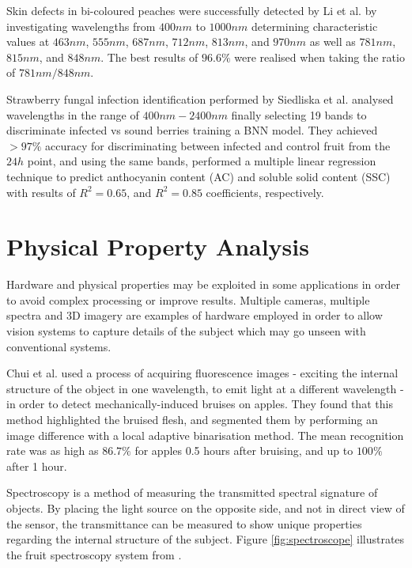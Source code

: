 \documentclass[fleqn,twoside,12pt]{report}
\begin{document}
Skin defects in bi-coloured peaches were successfully detected by Li et al.\cite{li2} by investigating wavelengths from $400nm$ to $1000nm$ determining characteristic values at $463nm$, $555nm$, $687nm$, $712nm$, $813nm$, and $970nm$ as well as $781nm$, $815nm$, and $848nm$. The best results of $96.6\%$ were realised when taking the ratio of $781nm/848nm$.

Strawberry fungal infection identification performed by Siedliska et al.\cite{siedliska} analysed wavelengths in the range of $400nm-2400nm$ finally selecting 19 bands to discriminate infected vs sound berries training a BNN model. They achieved $>97\%$ accuracy for discriminating between infected and control fruit from the $24h$ point, and using the same bands, performed a multiple linear regression technique to predict anthocyanin content (AC) and soluble solid content (SSC) with results of $R^2=0.65$, and $R^2=0.85$ coefficients, respectively.




\section{Physical Property Analysis}

Hardware and physical properties may be exploited in some applications in order to avoid complex processing or improve results. Multiple cameras, multiple spectra and 3D imagery are examples of hardware employed in order to allow vision systems to capture details of the subject which may go unseen with conventional systems. 


Chui et al.\cite{chiu} used a process of acquiring fluorescence images - exciting the internal structure of the object in one wavelength, to emit light at a different wavelength - in order to detect mechanically-induced bruises on apples. They found that this method highlighted the bruised flesh, and segmented them by performing an image difference with a local adaptive binarisation method. The mean recognition rate was as high as $86.7\%$ for apples 0.5 hours after bruising, and up to $100\%$ after 1 hour.


Spectroscopy is a method of measuring the transmitted spectral signature of objects. By placing the light source on the opposite side, and not in direct view of the sensor, the transmittance can be measured to show unique properties regarding the internal structure of the subject. Figure \ref{fig:spectroscope} illustrates the fruit spectroscopy system from \cite{choi}. 
\end{document}
